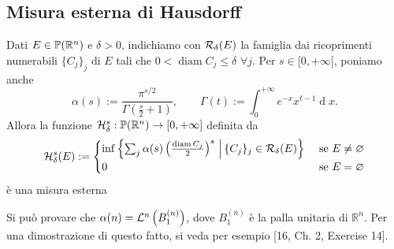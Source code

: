 \subsection{Misura esterna di Hausdorff}
\begin{shadedTheorem}\label{thm: 1.8 premisura Hausdorff}
  Dati $E\in\mathbb{P}(\mathbb{R}^n)$ e $\delta >0$, indichiamo con $\mathcal{R}_\delta (E)$ la famiglia dai ricoprimenti numerabili $\{C_j\}_j$ di $E$ tali che $0<\operatorname{diam}C_j\leq \delta$ $\forall j$. Per $s\in [0,+\infty[$, poniamo anche 
  \[\alpha(s):=\frac{\pi^{s/2}}{\Gamma\left(\frac{s}{2}+1\right)},\qquad \Gamma(t):=\int_0^{+\infty} e^{-x}x^{t-1}\operatorname{d}\!x.\]
  Allora la funzione $\mathcal{H}^s_\delta:\mathbb{P}(\mathbb{R}^n)\to [0,+\infty]$ definita da
  \[\mathcal{H}^s_\delta(E):=\begin{cases}
       \inf\left\{\sum_j\alpha(s)\left( \frac{\operatorname{diam}C_j}{2} \right)^s\,\Big|\,\{C_j\}_j\in\mathcal{R}_\delta (E)\right\} & \text{ se } E\neq \varnothing\\
       0 & \text{ se } E = \varnothing
   \end{cases}\]
   è una misura esterna
\end{shadedTheorem}

\begin{remark}Si può provare che $\alpha(n)=\mathcal{L}^{n}\left(B_{1}^{(n)}\right)$, dove $B_{1}^{(n)}$ è la palla unitaria di $\mathbb{R}^{n}$. Per una dimostrazione di questo fatto, si veda per esempio [16, Ch. 2, Exercise 14].
\end{remark}

